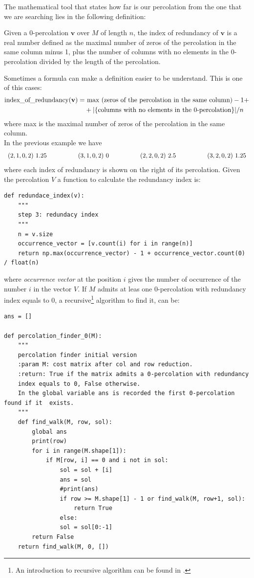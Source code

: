 \documentclass[12pt]{ClasseMatematicamente}
\begin{document}
\noindent
The mathematical tool that states how far is our percolation from the one that we are searching lies in the following definition:
\begin{definition}
 Given a $0$-percolation $\mathbf{v}$ over $M$ of length $n$, the index of redundancy of $\mathbf{v}$ is a real number defined as the maximal number of zeros of the percolation in the same column minus 1, plus the number of columns with no elements in the 0-percolation divided by the length of the percolation.
\end{definition}
Sometimes a formula can make a definition easier to be understand. This is one of this cases:
\begin{align*}
 \text{index\textunderscore of\textunderscore redundancy}(\mathbf{v}) 
 =& 
 \text{~max (zeros of the percolation in the same column)} -1 +\\
 &+ |\{ \text{columns with no elements in the 0-percolation} \} | /n
\end{align*}
where max is the maximal number of zeros of the percolation in the same column.\\
In the previous example we have
$$
\begin{array}{l l l l }
 (2,1,0,2)~1.25\qquad\qquad & (3,1,0,2)~0 \qquad\qquad & (2,2,0,2)~2.5 \qquad\qquad & (3,2,0,2)~1.25 
\end{array}
$$
where each index of redundancy is shown on the right of its percolation. 
Given the percolation $V$ a function to calculate the redundancy index is:

\begin{small}
\begin{lstlisting}
def redundace_index(v):
	"""
	step 3: redundacy index
	"""
	n = v.size
	occurrence_vector = [v.count(i) for i in range(n)]
	return np.max(occurrence_vector) - 1 + occurrence_vector.count(0) / float(n)
\end{lstlisting}
\end{small}

\noindent
where \emph{occurrence vector} at the position $i$ gives the number of occurrence of the number $i$ in the vector $V$.
If $M$ admits at leas one $0$-percolation with redundancy index equals to $0$, a recursive\footnote{An introduction to recursive algorithm can be found in \cite{sedgewick}.} algorithm to find it, can be:
\begin{small}
\begin{lstlisting}
ans = []

def percolation_finder_0(M):
	"""
	percolation finder initial version
	:param M: cost matrix after col and row reduction.
	:return: True if the matrix admits a 0-percolation with redundancy 
	index equals to 0, False otherwise. 
	In the global variable ans is recorded the first 0-percolation found if it  exists. 
	"""
	def find_walk(M, row, sol):
		global ans
		print(row)
		for i in range(M.shape[1]):
			if M[row, i] == 0 and i not in sol:
				sol = sol + [i]
				ans = sol
				#print(ans)
				if row >= M.shape[1] - 1 or find_walk(M, row+1, sol):
					return True                    
				else:
				sol = sol[0:-1] 
		return False 
	return find_walk(M, 0, [])
\end{lstlisting}
\end{small}
\end{document}
